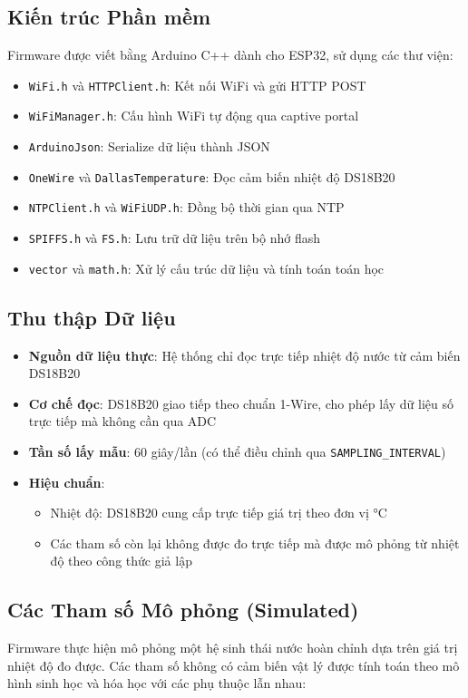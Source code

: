 \subsection{Kiến trúc Phần mềm}
Firmware được viết bằng Arduino C++ dành cho ESP32, sử dụng các thư viện:
\begin{itemize}
    \item \texttt{WiFi.h} và \texttt{HTTPClient.h}: Kết nối WiFi và gửi HTTP POST
    \item \texttt{WiFiManager.h}: Cấu hình WiFi tự động qua captive portal
    \item \texttt{ArduinoJson}: Serialize dữ liệu thành JSON
    \item \texttt{OneWire} và \texttt{DallasTemperature}: Đọc cảm biến nhiệt độ DS18B20
    \item \texttt{NTPClient.h} và \texttt{WiFiUDP.h}: Đồng bộ thời gian qua NTP
    \item \texttt{SPIFFS.h} và \texttt{FS.h}: Lưu trữ dữ liệu trên bộ nhớ flash
    \item \texttt{vector} và \texttt{math.h}: Xử lý cấu trúc dữ liệu và tính toán toán học
\end{itemize}

\subsection{Thu thập Dữ liệu}
\begin{itemize}
    \item \textbf{Nguồn dữ liệu thực}: Hệ thống chỉ đọc trực tiếp nhiệt độ nước từ cảm biến DS18B20
    \item \textbf{Cơ chế đọc}: DS18B20 giao tiếp theo chuẩn 1-Wire, cho phép lấy dữ liệu số trực tiếp mà không cần qua ADC
    \item \textbf{Tần số lấy mẫu}: 60 giây/lần (có thể điều chỉnh qua \texttt{SAMPLING\_INTERVAL})
    \item \textbf{Hiệu chuẩn}:
    \begin{itemize}
        \item Nhiệt độ: DS18B20 cung cấp trực tiếp giá trị theo đơn vị °C
        \item Các tham số còn lại không được đo trực tiếp mà được mô phỏng từ nhiệt độ theo công thức giả lập
    \end{itemize}
\end{itemize}

\subsection{Các Tham số Mô phỏng (Simulated)}
Firmware thực hiện mô phỏng một hệ sinh thái nước hoàn chỉnh dựa trên giá trị nhiệt độ đo được. Các tham số không có cảm biến vật lý được tính toán theo mô hình sinh học và hóa học với các phụ thuộc lẫn nhau:

